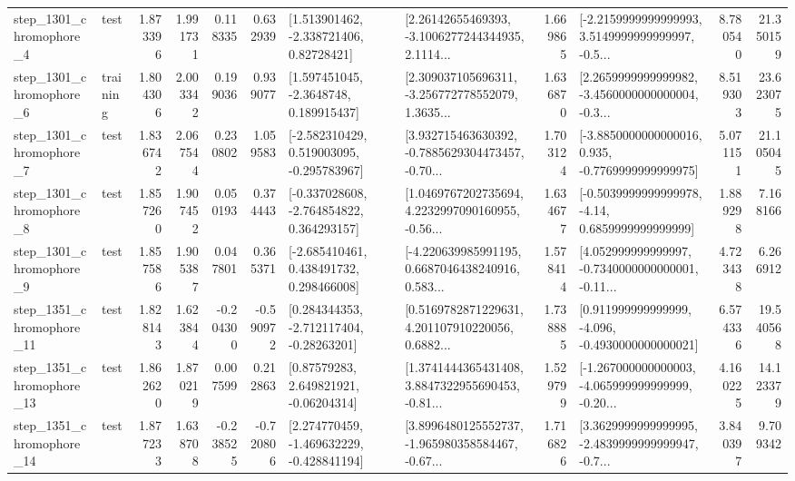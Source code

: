 \begin{tabular}{llrrrrllrlrr}
  step\_1301\_chromophore\_4 &      test &      1.873396 &    1.991731 &      0.118335 &  0.632939 &     [1.513901462, -2.338721406, 0.82728421] &  [2.26142655469393, -3.1006277244344935, 2.1114... &       1.669865 &  [-2.2159999999999993, 3.5149999999999997, -0.5... &            8.780540 &         21.350159 \\
  step\_1301\_chromophore\_6 &  training &      1.804306 &    2.003342 &      0.199036 &  0.939077 &      [1.597451045, -2.3648748, 0.189915437] &  [2.309037105696311, -3.256772778552079, 1.3635... &       1.636870 &  [2.2659999999999982, -3.4560000000000004, -0.3... &            8.519303 &         23.623075 \\
  step\_1301\_chromophore\_7 &      test &      1.836742 &    2.067544 &      0.230802 &  1.059583 &   [-2.582310429, 0.519003095, -0.295783967] &  [3.932715463630392, -0.7885629304473457, -0.70... &       1.703124 &  [-3.8850000000000016, 0.935, -0.7769999999999975] &            5.071151 &         21.105045 \\
  step\_1301\_chromophore\_8 &      test &      1.857260 &    1.907452 &      0.050193 &  0.374443 &   [-0.337028608, -2.764854822, 0.364293157] &  [1.0469767202735694, 4.2232997090160955, -0.56... &       1.634677 &   [-0.5039999999999978, -4.14, 0.6859999999999999] &            1.889298 &          7.168166 \\
  step\_1301\_chromophore\_9 &      test &      1.857586 &    1.905387 &      0.047801 &  0.365371 &    [-2.685410461, 0.438491732, 0.298466008] &  [-4.220639985991195, 0.6687046438240916, 0.583... &       1.578414 &  [4.052999999999997, -0.7340000000000001, -0.11... &            4.723438 &          6.266912 \\
 step\_1351\_chromophore\_11 &      test &      1.828143 &    1.623844 &     -0.204300 & -0.590972 &    [0.284344353, -2.712117404, -0.28263201] &  [0.5169782871229631, 4.201107910220056, 0.6882... &       1.738885 &   [0.911999999999999, -4.096, -0.4930000000000021] &            6.574336 &         19.540568 \\
 step\_1351\_chromophore\_13 &      test &      1.862620 &    1.870219 &      0.007599 &  0.212863 &      [0.87579283, 2.649821921, -0.06204314] &  [1.3741444365431408, 3.8847322955690453, -0.81... &       1.529799 &  [-1.267000000000003, -4.065999999999999, -0.20... &            4.160225 &         14.123379 \\
 step\_1351\_chromophore\_14 &      test &      1.877233 &    1.638708 &     -0.238525 & -0.720806 &   [2.274770459, -1.469632229, -0.428841194] &  [3.8996480125552737, -1.965980358584467, -0.67... &       1.716826 &  [3.3629999999999995, -2.4839999999999947, -0.7... &            3.840397 &          9.709342 \\

\end{tabular}
